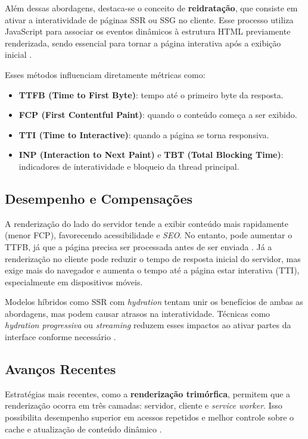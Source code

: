Além dessas abordagens, destaca-se o conceito de \textbf{reidratação}, que consiste em ativar a interatividade de páginas SSR ou SSG no cliente. Esse processo utiliza JavaScript para associar os eventos dinâmicos à estrutura HTML previamente renderizada, sendo essencial para tornar a página interativa após a exibição inicial \cite{osmani2025}.


Esses métodos influenciam diretamente métricas como:

\begin{itemize}
    \item \textbf{TTFB (Time to First Byte)}: tempo até o primeiro byte da resposta.
    \item \textbf{FCP (First Contentful Paint)}: quando o conteúdo começa a ser exibido.
    \item \textbf{TTI (Time to Interactive)}: quando a página se torna responsiva.
    \item \textbf{INP (Interaction to Next Paint)} e \textbf{TBT (Total Blocking Time)}: indicadores de interatividade e bloqueio da thread principal.
\end{itemize}

\subsection*{Desempenho e Compensações}

A renderização do lado do servidor tende a exibir conteúdo mais rapidamente (menor FCP), favorecendo acessibilidade e \textit{SEO}. No entanto, pode aumentar o TTFB, já que a página precisa ser processada antes de ser enviada \cite{osmani2025}. Já a renderização no cliente pode reduzir o tempo de resposta inicial do servidor, mas exige mais do navegador e aumenta o tempo até a página estar interativa (TTI), especialmente em dispositivos móveis.

Modelos híbridos como SSR com \textit{hydration} tentam unir os benefícios de ambas as abordagens, mas podem causar atrasos na interatividade. Técnicas como \textit{hydration progressiva} ou \textit{streaming} reduzem esses impactos ao ativar partes da interface conforme necessário \cite{osmani2025}.

\subsection*{Avanços Recentes}

Estratégias mais recentes, como a \textbf{renderização trimórfica}, permitem que a renderização ocorra em três camadas: servidor, cliente e \textit{service worker}. Isso possibilita desempenho superior em acessos repetidos e melhor controle sobre o cache e atualização de conteúdo dinâmico \cite{osmani2025}.


